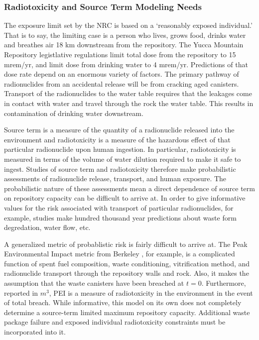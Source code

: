 \subsubsection{Radiotoxicity and Source Term Modeling Needs}

The exposure limit set by the NRC is based on a `reasonably exposed 
individual.' That is to say, the limiting case is a person who lives, 
grows food, drinks water and breathes air 18 km downstream from the 
repository. The Yucca Mountain Repository legistlative regulations 
limit total dose from the repository to 15 mrem/yr, and limit dose 
from drinking water to 4 mrem/yr.  Predictions of that dose rate 
depend on an enormous variety of factors. The primary pathway of 
radionuclides from an accidental release will be from cracking aged 
canisters. Transport of the radionuclides to the water table requires 
that the leakages come in contact with water and travel through the 
rock the water table. This results in contamination of drinking water 
downstream.  

Source term is a measure of the quantity of a radionuclide released 
into the environment and radiotoxicity is a measure of the hazardous 
effect of that particular radionuclide upon human ingestion. In 
particular, radiotoxicity is measured in terms of the volume of water 
dilution required to make it safe to ingest. Studies of source term 
and radiotoxicity therefore make probabilistic assessments of 
radionuclide release, transport, and human exposure.  The 
probabilistic nature of these assessments mean a direct dependence of 
source term on repository capacity can be difficult to arrive at. In 
order to give informative values for the risk associated with 
transport of particular radionuclides, for example, studies make 
hundred thousand year predictions about waste form degredation, water 
flow, etc.  

A generalized metric of probablistic risk is fairly difficult to 
arrive at. The Peak Environmental Impact metric from Berkeley 
\cite{bouvier_comparison_2007}, for example, is a complicated function 
of spent fuel composition, waste conditioning, vitrification method, 
and radionuclide transport through the repository walls and rock.  
Also, it makes the assumption that the waste canisters have been 
breached at $t=0$. Furthermore, reported in $m^3$, PEI is a measure of 
radiotoxicity in the environment in the event of total breach. While 
informative, this model on its own does not completely determine a 
source-term limited maximum repository capacity. Additional waste 
package failure and exposed individual radiotoxicity constraints must 
be incorporated into it.


